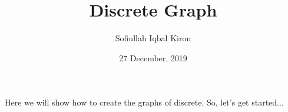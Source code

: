 \documentclass[11 pt]{article}
\title{\textbf{Discrete Graph}}
\author{Sofiullah Iqbal Kiron}
\date{27 December, 2019}
\begin{document}
\maketitle
{}

Here we will show how to create the graphs of discrete. So, let's get started...
\end{document}
